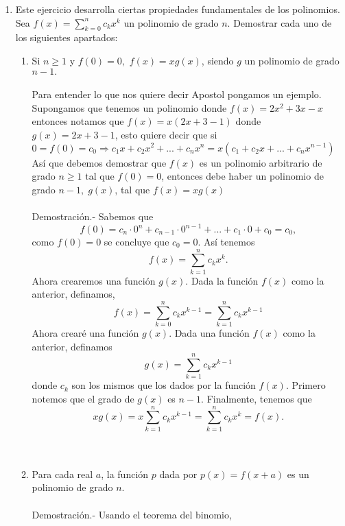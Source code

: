 \begin{enumerate}
        \item Este ejercicio desarrolla ciertas propiedades fundamentales de los polinomios. Sea $f(x)=\displaystyle\sum_{k=0}^{n} c_k x^k$ un polinomio de grado $n$. Demostrar cada uno de los siguientes apartados:
            \begin{enumerate}[\bfseries (a)]
                \item Si $n \geq 1$ \; y \; $f(0)=0,$ $f(x)=xg(x)$, siendo $g$ un polinomio de grado $n-1.$\\\\
                Para entender lo que nos quiere decir Apostol pongamos un ejemplo. Supongamos que tenemos un polinomio donde $f(x)=2x^2+3x-x$ entonces notamos que $f(x)=x(2x+3-1)$ donde $g(x)=2x+3-1$, esto quiere decir que si $0 = f(0)=c_0 \Rightarrow c_1 x + c_2 x^2 + ... + c_n x^n = x(c_1 + c_2 x + ... + c_n x^{n-1})$ 
                Así que debemos demostrar que $f(x)$ es un polinomio arbitrario de grado $n \geq 1$ tal que $f(0)=0$, entonces debe haber un polinomio de grado $n-1, \; g(x)$, tal que $f(x)=xg(x)$\\\\
                Demostración.- \; Sabemos que $$f(0) = c_n \cdot 0^n + c_{n-1} \cdot 0^{n-1} + ... + c_1 \cdot 0 + c_0 =c_0,$$ como $f(0)=0$ se concluye que $c_0=0$. Así tenemos $$f(x)=\displaystyle\sum_{k=1}^{n} c_k x^k.$$ Ahora crearemos una función $g(x).$ Dada la función $f(x)$ como la anterior, definamos, $$f(x)=\displaystyle\sum_{k=0}^{n} c_k x^{k-1} = \sum_{k=1}^{n} c_k x^{k-1}$$ 
                Ahora crearé una función $g(x)$. Dada una función $f(x)$ como la anterior, definamos  $$g(x) = \displaystyle\sum_{k=1}^{n} c_k x^{k-1}$$
                donde $c_k$ son los mismos que los dados por la función $f(x)$. Primero notemos que el grado de $g(x)$ es $n-1$. Finalmente, tenemos que $$ xg(x) = x \displaystyle\sum_{k=1}^{n} c_k x^{k-1} = \sum_{k=1}^{n} c_k x^k = f(x).$$ \\\\
                \item Para cada real $a$, la función $p$ dada por $p(x)=f(x+a)$ es un polinomio de grado $n.$\\\\
                Demostración.- \; Usando el teorema del binomio,
                    \begin{center}
                        \begin{tabular}{r c l}

\end{tabular}
\end{center}
\end{enumerate}
\end{enumerate}
